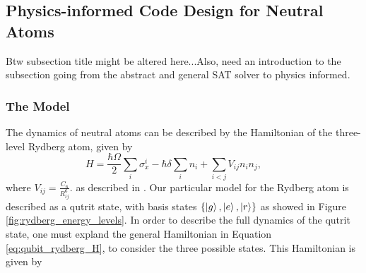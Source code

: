 \documentclass[amssymb,twocolumn,aps]{revtex4-2}
\begin{document}
\subsection{Physics-informed Code Design for Neutral Atoms}
Btw subsection title might be altered here...Also, need an introduction to the subsection going from the abstract and general SAT solver to physics informed.
\subsubsection{The Model}
The dynamics of neutral atoms can be described by the Hamiltonian of the three-level Rydberg atom, given by
\begin{equation}
H = \frac{\hbar \Omega}{2} \sum_i \sigma_x^i
- \hbar \delta \sum_i n_i
+ \sum_{i<j} V_{ij} n_i n_j,
\qquad
\label{eq:qubit_rydberg_H}
\end{equation}
where $V_{ij} = \frac{C_6}{R_{ij}^6}.$ as described in \cite{Browaeys2020}. Our particular model for the Rydberg atom is described as a qutrit state, with basis states $\{\ket{g}, \ket{e}, \ket{r}\}$ as showed in Figure \ref{fig:rydberg_energy_levels}. In order to describe the full dynamics of the qutrit state, one must expland the general Hamiltonian in Equation \ref{eq:qubit_rydberg_H}, to consider the three possible states. This Hamiltonian is given by
\end{document}
